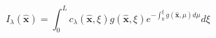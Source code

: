 \begin{equation}
I_\lambda(\hat{\mathbf{x}})=
\int_0^L c_\lambda(\hat{\mathbf{x}}, \xi)
g(\hat{\mathbf{x}},\xi)
e^{-\int_0^\xi g(\hat{\mathbf{x}},\mu)d\mu}
d\xi
\label{eq:volume_render_equation}
\end{equation}
